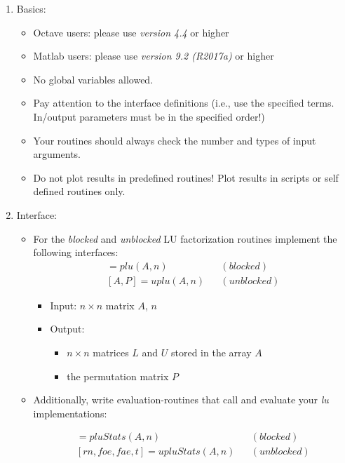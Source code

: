 \documentclass{scrartcl}
\begin{document}
\begin{enumerate}
	\item Basics:
	\begin{itemize}
		\item Octave users: please use \textit{version 4.4} or higher
		\item Matlab users: please use \textit{version 9.2 (R2017a)} or higher 
		\item No global variables allowed.
		\item Pay attention to the interface definitions (i.e., use the specified terms. In/output parameters must be in the specified order!)
		\item Your routines should always check the number and types of input arguments.
		\item Do not plot results in predefined routines! Plot results in scripts or self defined routines only.
	\end{itemize}
	\item Interface:
	\begin{itemize}
		\item For the \textit{blocked} and \textit{unblocked} LU factorization routines implement the following interfaces:
		\vspace{0.2cm}
		\begin{eqnarray*}
			[A, P] = plu(A, n)&&(\textit{blocked}) \\
			{}[A, P] = uplu(A, n)&&(\textit{unblocked})
		\end{eqnarray*}
	
		\vspace{0.2cm}
		\begin{itemize}
			\item Input: $n \times n$ matrix $A$, $n$
			\item Output: 
			\begin{itemize}
				\item $n \times n$ matrices $L$ and $U$ stored in the array $A$
				\item the permutation matrix $P$
			\end{itemize}
		\end{itemize}
		\vspace{0.2cm}

		\item Additionally, write evaluation-routines that call and evaluate your \textit{lu} implementations:
		
		\begin{eqnarray*}
			 [rn, foe, fae, t] = pluStats(A, n)&&(\textit{blocked})\\
			{}[rn, foe, fae, t] = upluStats(A, n)&&(\textit{unblocked})
		\end{eqnarray*}
		

\end{itemize}
\end{enumerate}
\end{document}

